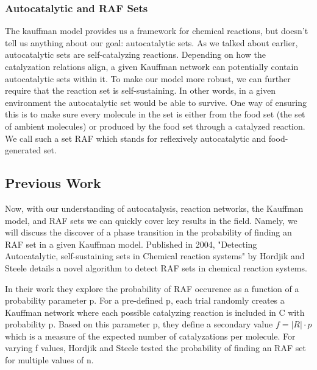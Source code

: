 \documentclass[11pt]{article}
\begin{document}
\subsubsection*{Autocatalytic and RAF Sets}

The kauffman model provides us a framework for chemical reactions, but doesn’t tell us anything about our goal: autocatalytic sets. 
As we talked about earlier, autocatalytic sets are self-catalyzing reactions. 
Depending on how the catalyzation relations align, a given Kauffman network can potentially contain autocatalytic sets within it. 
To make our model more robust, we can further require that the reaction set is self-sustaining. In other words, in a given environment the autocatalytic set would be able to survive. 
One way of ensuring this is to make sure every molecule in the set is either from the food set (the set of ambient molecules) or produced by the food set through a catalyzed reaction.
 We call such a set RAF which stands for reflexively autocatalytic and food-generated set. 

\subsection{Previous Work}

Now, with our understanding of autocatalysis, reaction networks, the Kauffman model, and RAF sets we can quickly cover key results in the field.
Namely, we will discuss the discover of a phase transition in the probability of finding an RAF set in a given Kauffman model.
Published in 2004, "Detecting Autocatalytic, self-sustaining sets in Chemical reaction systems" by Hordjik and Steele details a novel algorithm to detect RAF sets in chemical reaction systems.

In their work they explore the probability of RAF occurence as a function of a probability parameter p. For a pre-defined p, each trial randomly creates a Kauffman network where each possible catalyzing reaction is included in C with probability p.
Based on this parameter p, they define a secondary value $f = |R| \cdot p$ which is a measure of the expected number of catalyzations per molecule.
For varying f values, Hordjik and Steele tested the probability of finding an RAF set for multiple values of n. 
\end{document}
